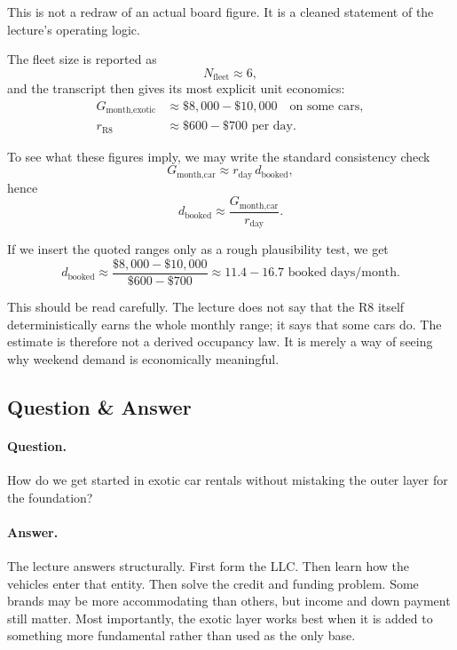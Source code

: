 This is not a redraw of an actual board figure. It is a cleaned statement of the lecture's operating logic.

The fleet size is reported as
\begin{equation}
N_{\text{fleet}} \approx 6,
\end{equation}
and the transcript then gives its most explicit unit economics:
\begin{align}
G_{\text{month,exotic}} &\approx \$8{,}000-\$10{,}000 \quad \text{on some cars},\\
r_{\text{R8}} &\approx \$600-\$700 \text{ per day}.
\end{align}

To see what these figures imply, we may write the standard consistency check
\begin{equation}
G_{\text{month,car}} \approx r_{\text{day}}\,d_{\text{booked}},
\end{equation}
hence
\begin{equation}
d_{\text{booked}} \approx \frac{G_{\text{month,car}}}{r_{\text{day}}}.
\end{equation}

If we insert the quoted ranges only as a rough plausibility test, we get
\begin{equation}
d_{\text{booked}} \approx \frac{\$8{,}000-\$10{,}000}{\$600-\$700}
\approx 11.4-16.7 \text{ booked days/month}.
\end{equation}

This should be read carefully. The lecture does not say that the R8 itself deterministically earns the whole monthly range; it says that some cars do. The estimate is therefore not a derived occupancy law. It is merely a way of seeing why weekend demand is economically meaningful.

\subsection{Question \& Answer}

\paragraph{Question.} How do we get started in exotic car rentals without mistaking the outer layer for the foundation?

\paragraph{Answer.} The lecture answers structurally. First form the LLC. Then learn how the vehicles enter that entity. Then solve the credit and funding problem. Some brands may be more accommodating than others, but income and down payment still matter. Most importantly, the exotic layer works best when it is added to something more fundamental rather than used as the only base.

